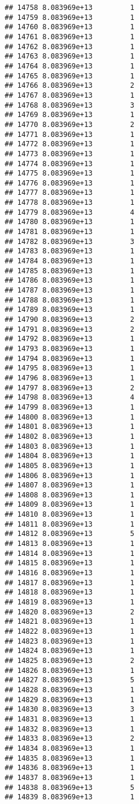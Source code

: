 \documentclass[
]{article}
\begin{document}
\begin{verbatim}
## 14758 8.083969e+13         1
## 14759 8.083969e+13         1
## 14760 8.083969e+13         1
## 14761 8.083969e+13         1
## 14762 8.083969e+13         1
## 14763 8.083969e+13         1
## 14764 8.083969e+13         1
## 14765 8.083969e+13         1
## 14766 8.083969e+13         2
## 14767 8.083969e+13         1
## 14768 8.083969e+13         3
## 14769 8.083969e+13         1
## 14770 8.083969e+13         2
## 14771 8.083969e+13         1
## 14772 8.083969e+13         1
## 14773 8.083969e+13         1
## 14774 8.083969e+13         1
## 14775 8.083969e+13         1
## 14776 8.083969e+13         1
## 14777 8.083969e+13         1
## 14778 8.083969e+13         1
## 14779 8.083969e+13         4
## 14780 8.083969e+13         1
## 14781 8.083969e+13         1
## 14782 8.083969e+13         3
## 14783 8.083969e+13         1
## 14784 8.083969e+13         1
## 14785 8.083969e+13         1
## 14786 8.083969e+13         1
## 14787 8.083969e+13         1
## 14788 8.083969e+13         1
## 14789 8.083969e+13         1
## 14790 8.083969e+13         2
## 14791 8.083969e+13         2
## 14792 8.083969e+13         1
## 14793 8.083969e+13         1
## 14794 8.083969e+13         1
## 14795 8.083969e+13         1
## 14796 8.083969e+13         1
## 14797 8.083969e+13         2
## 14798 8.083969e+13         4
## 14799 8.083969e+13         1
## 14800 8.083969e+13         1
## 14801 8.083969e+13         1
## 14802 8.083969e+13         1
## 14803 8.083969e+13         1
## 14804 8.083969e+13         1
## 14805 8.083969e+13         1
## 14806 8.083969e+13         1
## 14807 8.083969e+13         1
## 14808 8.083969e+13         1
## 14809 8.083969e+13         1
## 14810 8.083969e+13         1
## 14811 8.083969e+13         1
## 14812 8.083969e+13         5
## 14813 8.083969e+13         1
## 14814 8.083969e+13         1
## 14815 8.083969e+13         1
## 14816 8.083969e+13         1
## 14817 8.083969e+13         1
## 14818 8.083969e+13         1
## 14819 8.083969e+13         1
## 14820 8.083969e+13         2
## 14821 8.083969e+13         1
## 14822 8.083969e+13         1
## 14823 8.083969e+13         1
## 14824 8.083969e+13         1
## 14825 8.083969e+13         2
## 14826 8.083969e+13         1
## 14827 8.083969e+13         5
## 14828 8.083969e+13         1
## 14829 8.083969e+13         1
## 14830 8.083969e+13         3
## 14831 8.083969e+13         1
## 14832 8.083969e+13         1
## 14833 8.083969e+13         2
## 14834 8.083969e+13         1
## 14835 8.083969e+13         1
## 14836 8.083969e+13         1
## 14837 8.083969e+13         1
## 14838 8.083969e+13         5
## 14839 8.083969e+13         1

\end{verbatim}
\end{document}
